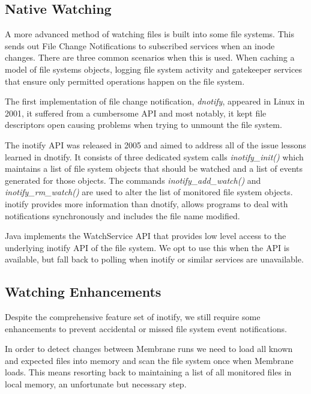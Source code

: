 \documentclass[11pt, a4paper, twocolumn, twoside]{report}
\begin{document}
\subsection{Native Watching}

A more advanced method of watching files is built into some file systems. This sends out File Change Notifications to subscribed services when an inode changes. There are three common scenarios when this is used. When caching a model of file systems objects, logging file system activity and gatekeeper services that ensure only permitted operations happen on the file system. \citep{kerrisk2014fcn}

The first implementation of file change notification, \emph{dnotify}, appeared in Linux in 2001, it suffered from a cumbersome API and most notably, it kept file descriptors open causing problems when trying to unmount the file system. \citep{kerrisk2014fcn}

The inotify API was released in 2005 and aimed to address all of the issue lessons learned in dnotify. It consists of three dedicated system calls \emph{inotify\_init()} which maintains a list of file system objects that should be watched and a list of events generated for those objects. The commands \emph{inotify\_add\_watch()} and \emph{inotify\_rm\_watch()} are used to alter the list of monitored file system objects. inotify provides more information than dnotify, allows programs to deal with notifications synchronously and includes the file name modified. \citep{kerrisk2014fcn}

Java implements the WatchService API that provides low level access to the underlying inotify API of the file system. \citep{oracle2017dir} We opt to use this when the API is available, but fall back to polling when inotify or similar services are unavailable.

\subsection{Watching Enhancements}

Despite the comprehensive feature set of inotify, we still require some enhancements to prevent accidental or missed file system event notifications. 

In order to detect changes between Membrane runs we need to load all known and expected files into memory and scan the file system once when Membrane loads. This means resorting back to maintaining a list of all monitored files in local memory, an unfortunate but necessary step.
\end{document}
